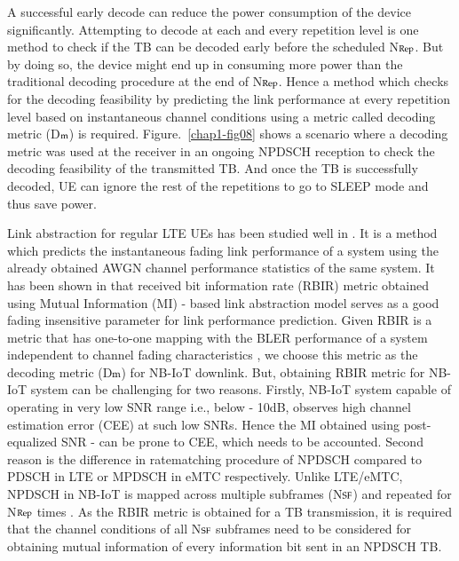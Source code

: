 \begin{multicols}{2}
A successful early decode can reduce the power consumption of the device significantly. Attempting to decode at each and every repetition level is one method to check if the TB can be decoded early before the scheduled N$\scriptsize{\text{Rep}}$. But by doing so, the device might end up in consuming more power than the traditional decoding procedure at the end of N$\scriptsize{\text{Rep}}$. Hence a method which checks for the decoding feasibility by predicting the link performance at every repetition level based on instantaneous channel conditions using a metric called decoding metric (D$\scriptsize{\text{m}}$) is required. Figure.~\ref{chap1-fig08} shows a scenario where a decoding metric was used at the receiver in an ongoing NPDSCH reception to check the decoding feasibility of the transmitted TB. And once the TB is successfully decoded, UE can ignore the rest of the repetitions to go to SLEEP mode and thus save power.

Link abstraction for regular LTE UEs has been studied well in \cite{art1-key29}. It is a method which predicts the instantaneous fading link performance of a system using the already obtained AWGN channel performance statistics of the same system. It has been shown in \cite{art1-key29} that received bit information rate (RBIR) metric obtained using Mutual Information (MI) - based link abstraction model serves as a good fading insensitive parameter for link performance prediction. Given RBIR is a metric that has one-to-one mapping with the BLER performance of a system independent to channel fading characteristics \cite{art1-key07}, we choose this metric as the decoding metric (D$\scriptsize{\text{m}}$) for NB-IoT downlink. But, obtaining RBIR metric for NB-IoT system can be challenging for two reasons. Firstly, NB-IoT system capable of operating in very low SNR range i.e., below - 10dB, observes high channel estimation error (CEE) at such low SNRs. Hence the MI obtained using post-equalized SNR \cite{art1-key29}-\cite{art1-key30} can be prone to CEE, which needs to be accounted. Second reason is the difference in ratematching procedure of NPDSCH compared to PDSCH in LTE or MPDSCH in eMTC respectively. Unlike LTE/eMTC, NPDSCH in NB-IoT is mapped across multiple subframes (N$\scriptsize{\text{SF}}$) and repeated for N$\scriptsize{\text{Rep}}$ times \cite{art1-key27}. As the RBIR metric is obtained for a TB transmission, it is required that the channel conditions of all N$\scriptsize{\text{SF}}$ subframes need to be considered for obtaining mutual information of every information bit sent in an NPDSCH TB.


\end{multicols}
